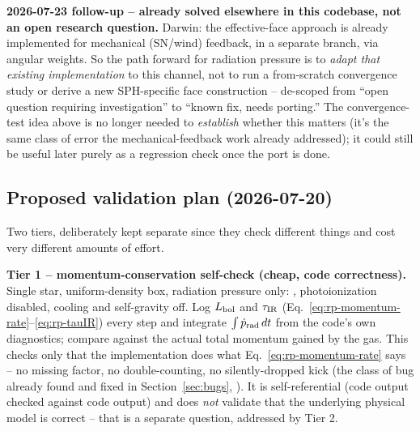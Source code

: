 \begin{itemize}
    \textbf{2026-07-23 follow-up -- already solved elsewhere in this
    codebase, not an open research question.} Darwin: the effective-face
    approach is already implemented for mechanical (SN/wind) feedback,
    in a separate branch, via angular weights. So the path forward for
    radiation pressure is to \emph{adapt that existing implementation}
    to this channel, not to run a from-scratch convergence study or
    derive a new SPH-specific face construction -- de-scoped from
    ``open question requiring investigation'' to ``known fix, needs
    porting.'' The convergence-test idea above is no longer needed to
    \emph{establish} whether this matters (it's the same class of error
    the mechanical-feedback work already addressed); it could still be
    useful later purely as a regression check once the port is done.
\end{itemize}

\subsection{Proposed validation plan (2026-07-20)}
\label{sec:rp-validation-plan}

Two tiers, deliberately kept separate since they check different
things and cost very different amounts of effort.

\textbf{Tier 1 -- momentum-conservation self-check (cheap, code
correctness).} Single star, uniform-density box, radiation pressure
only: , photoionization
disabled, cooling and self-gravity off. Log $L_{\rm bol}$ and
$\tau_{\rm IR}$ (Eq.~\ref{eq:rp-momentum-rate}--\ref{eq:rp-tauIR}) every
step and integrate $\int \dot p_{\rm rad}\,dt$ from the code's own
diagnostics; compare against the actual total momentum gained by the
gas. This checks only that the implementation does what
Eq.~\ref{eq:rp-momentum-rate} says -- no missing factor, no
double-counting, no silently-dropped kick (the class of bug already
found and fixed in Section~\ref{sec:bugs},
). It is self-referential (code output
checked against code output) and does \emph{not} validate that the
underlying physical model is correct -- that is a separate question,
addressed by Tier 2.

